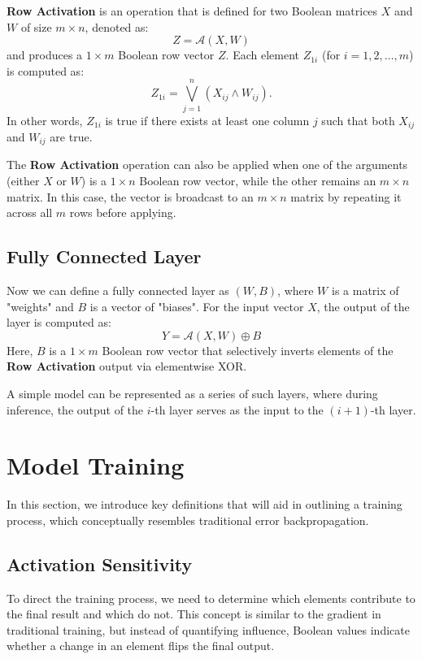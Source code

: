 \documentclass[pmlr]{jmlr}
\begin{document}
\begin{definition}
    \textbf{Row Activation} is an operation that is defined for two Boolean matrices \( X \) and \( W \) of size \( m \times n \), denoted as:
    \[ Z = \mathcal{A}(X, W) \]
    and produces a \( 1 \times m \) Boolean row vector \( Z \). Each element \( Z_{1i} \) (for \( i = 1, 2, \dots, m \)) is computed as:
    \[ Z_{1i} = \bigvee_{j=1}^{n} \left( X_{ij} \wedge W_{ij} \right). \]
    In other words, \( Z_{1i} \) is true if there exists at least one column \( j \) such that both \( X_{ij} \) and \( W_{ij} \) are true.

    The \textbf{Row Activation} operation can also be applied when one of the arguments (either \( X \) or \( W \)) is a \( 1 \times n \) Boolean row vector, while the other remains an \( m \times n \) matrix. In this case, the vector is broadcast to an \( m \times n \) matrix by repeating it across all \( m \) rows before applying.
\end{definition}

\subsection{Fully Connected Layer}
Now we can define a fully connected layer as \( (W, B) \), where \( W \) is a matrix of "weights" and \( B \) is a vector of "biases". For the input vector \( X \), the output of the layer is computed as:
\[ Y = \mathcal{A}(X, W) \oplus B \]
Here, \( B \) is a \( 1 \times m \) Boolean row vector that selectively inverts elements of the \textbf{Row Activation} output via elementwise XOR.

A simple model can be represented as a series of such layers, where during inference, the output of the \( i \)-th layer serves as the input to the \( (i+1) \)-th layer.

\section{Model Training}
In this section, we introduce key definitions that will aid in outlining a training process, which conceptually resembles traditional error backpropagation.

\subsection{Activation Sensitivity}
To direct the training process, we need to determine which elements contribute to the final result and which do not. This concept is similar to the gradient in traditional training, but instead of quantifying influence, Boolean values indicate whether a change in an element flips the final output.
\end{document}

